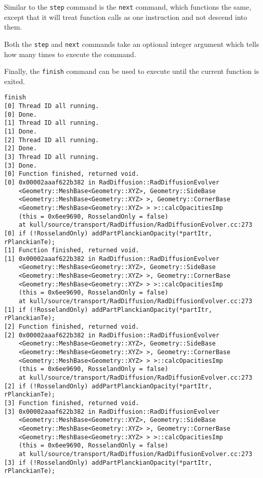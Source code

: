 \documentclass{refart}
\begin{document}
Similar to the \texttt{step} command is the \texttt{next} command, which functions the same, except that it will treat function calls as one instruction and not descend into them.

Both the \texttt{step} and \texttt{next} commands take an optional integer argument which tells how many times to execute the command.

Finally, the \texttt{finish} command can be used to execute until the current function is exited.

\begin{Verbatim}
finish
[0] Thread ID all running.
[0] Done.
[1] Thread ID all running.
[1] Done.
[2] Thread ID all running.
[2] Done.
[3] Thread ID all running.
[3] Done.
[0] Function finished, returned void.
[0] 0x00002aaaf622b382 in RadDiffusion::RadDiffusionEvolver
    <Geometry::MeshBase<Geometry::XYZ>, Geometry::SideBase
    <Geometry::MeshBase<Geometry::XYZ> >, Geometry::CornerBase
    <Geometry::MeshBase<Geometry::XYZ> > >::calcOpacitiesImp
    (this = 0x6ee9690, RosselandOnly = false)
    at kull/source/transport/RadDiffusion/RadDiffusionEvolver.cc:273
[0] if (!RosselandOnly) addPartPlanckianOpacity(*partItr, rPlanckianTe);
[1] Function finished, returned void.
[1] 0x00002aaaf622b382 in RadDiffusion::RadDiffusionEvolver
    <Geometry::MeshBase<Geometry::XYZ>, Geometry::SideBase
    <Geometry::MeshBase<Geometry::XYZ> >, Geometry::CornerBase
    <Geometry::MeshBase<Geometry::XYZ> > >::calcOpacitiesImp
    (this = 0x6ee9690, RosselandOnly = false)
    at kull/source/transport/RadDiffusion/RadDiffusionEvolver.cc:273
[1] if (!RosselandOnly) addPartPlanckianOpacity(*partItr, rPlanckianTe);
[2] Function finished, returned void.
[2] 0x00002aaaf622b382 in RadDiffusion::RadDiffusionEvolver
    <Geometry::MeshBase<Geometry::XYZ>, Geometry::SideBase
    <Geometry::MeshBase<Geometry::XYZ> >, Geometry::CornerBase
    <Geometry::MeshBase<Geometry::XYZ> > >::calcOpacitiesImp
    (this = 0x6ee9690, RosselandOnly = false)
    at kull/source/transport/RadDiffusion/RadDiffusionEvolver.cc:273
[2] if (!RosselandOnly) addPartPlanckianOpacity(*partItr, rPlanckianTe);
[3] Function finished, returned void.
[3] 0x00002aaaf622b382 in RadDiffusion::RadDiffusionEvolver
    <Geometry::MeshBase<Geometry::XYZ>, Geometry::SideBase
    <Geometry::MeshBase<Geometry::XYZ> >, Geometry::CornerBase
    <Geometry::MeshBase<Geometry::XYZ> > >::calcOpacitiesImp
    (this = 0x6ee9690, RosselandOnly = false)
    at kull/source/transport/RadDiffusion/RadDiffusionEvolver.cc:273
[3] if (!RosselandOnly) addPartPlanckianOpacity(*partItr, rPlanckianTe);
\end{Verbatim}
\end{document}
